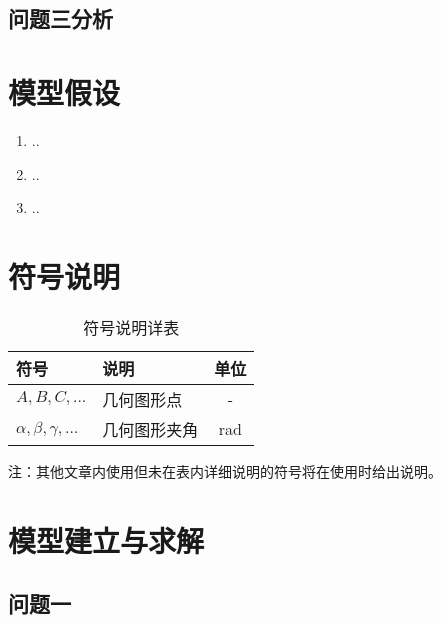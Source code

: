 \documentclass[withoutpreface,bwprint]{cumcmthesis} %
\begin{document}
\subsection{问题三分析}

\section{模型假设}

\begin{enumerate}
    \item ..
    \item ..
    \item ..
\end{enumerate}

\section{符号说明}

\begin{table}[H]
    \centering  %
    \caption{符号说明详表}  %
    \label{tab:表标签}  %
    \begin{threeparttable}
        \begin{tabularx}{\textwidth}{p{} p{} c}
            \toprule[1.5pt]
            \textbf{符号} & \textbf{说明} & \textbf{单位} \\ 
            \midrule[1pt]
            $A, B, C, ...$ & 几何图形点 & - \\
            $\alpha, \beta, \gamma, ...$ & 几何图形夹角 & rad \\
            \bottomrule[1.5pt]
        
        \end{tabularx}
        \begin{tablenotes}
            \footnotesize
            \item 注：其他文章内使用但未在表内详细说明的符号将在使用时给出说明。
        \end{tablenotes}
    \end{threeparttable}
\end{table}




\section{模型建立与求解}
\subsection{问题一}
\end{document}
